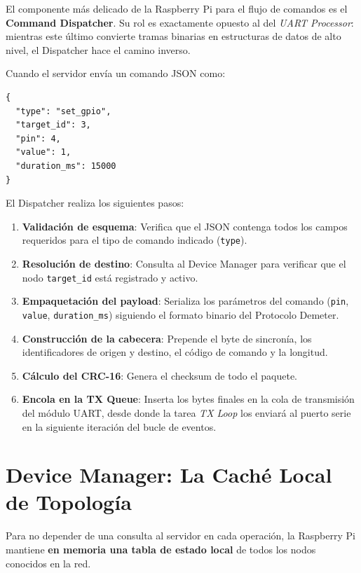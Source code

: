El componente más delicado de la Raspberry Pi para el flujo de comandos es el 
\textbf{Command Dispatcher}. Su rol es exactamente opuesto al del \textit{UART Processor}: 
mientras este último convierte tramas binarias en estructuras de datos de alto nivel, 
el Dispatcher hace el camino inverso.

Cuando el servidor envía un comando JSON como:
\begin{lstlisting}[style=trama, caption={Ejemplo de comando JSON recibido por la Raspberry Pi}]
{
  "type": "set_gpio",
  "target_id": 3,
  "pin": 4,
  "value": 1,
  "duration_ms": 15000
}
\end{lstlisting}

El Dispatcher realiza los siguientes pasos:

\begin{enumerate}
    \item \textbf{Validación de esquema}: Verifica que el JSON contenga todos los campos 
          requeridos para el tipo de comando indicado (\texttt{type}).
    \item \textbf{Resolución de destino}: Consulta al Device Manager para verificar 
          que el nodo \texttt{target\_id} está registrado y activo.
    \item \textbf{Empaquetación del payload}: Serializa los parámetros del comando 
          (\texttt{pin}, \texttt{value}, \texttt{duration\_ms}) siguiendo el formato 
          binario del Protocolo Demeter.
    \item \textbf{Construcción de la cabecera}: Prepende el byte de sincronía, 
          los identificadores de origen y destino, el código de comando y la longitud.
    \item \textbf{Cálculo del CRC-16}: Genera el checksum de todo el paquete.
    \item \textbf{Encola en la TX Queue}: Inserta los bytes finales en la cola 
          de transmisión del módulo UART, desde donde la tarea \textit{TX Loop} los 
          enviará al puerto serie en la siguiente iteración del bucle de eventos.
\end{enumerate}


\section{Device Manager: La Caché Local de Topología}

Para no depender de una consulta al servidor en cada operación, la Raspberry Pi mantiene 
\textbf{en memoria una tabla de estado local} de todos los nodos conocidos en la red.

